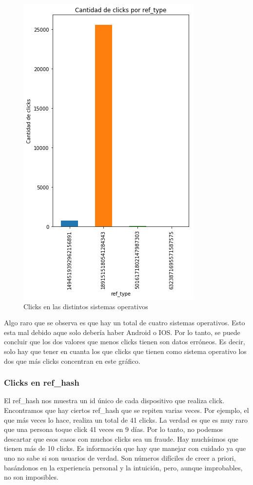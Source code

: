 \documentclass[a4paper, 12pt]{article}
\begin{document}
		\begin{figure}[H]
			\centering
			\includegraphics[scale = 0.6]{images/clicks/clicks_ref_type.png}
			\caption{Clicks en las distintos sistemas operativos}
		\end{figure}


		 Algo raro que se observa es que hay un total de cuatro sistemas operativos. Esto esta mal debido aque solo
		debería haber Android o IOS. Por lo tanto, se puede concluir que los dos valores que menos clicks tienen son datos
		erróneos. Es decir, solo hay que tener en cuanta los que clicks que tienen como sistema operativo los dos que más
		clicks concentran en este gráfico.

	\subsubsection{Clicks en ref\_hash}
		 El ref\_hash nos muestra un id único de cada dispositivo que realiza click. Encontramos que hay ciertos ref\_hash que se
		repiten varias veces. Por ejemplo, el que más veces lo hace, realiza un total de 41 clicks. La verdad es que es
		muy raro que una persona toque click 41 veces en 9 días. Por lo tanto, no podemos descartar que esos casos con
		muchos clicks sea un fraude. Hay muchísimos que tienen más de 10 clicks. Es información que hay que manejar con
		cuidado ya que uno no sabe si son usuarios de verdad. Son números difíciles de creer a priori, basándonos en la
		experiencia personal y la intuición, pero, aunque improbables, no son imposibles.
\end{document}
